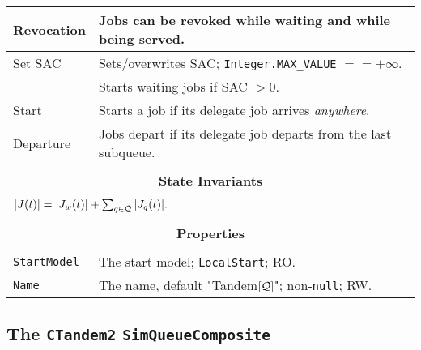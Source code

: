 \begin{tabular}{|l|l|}
Revocation & Jobs can be revoked while waiting and while being served. \\
\hline
Set SAC & Sets/overwrites SAC; \lstinline|Integer.MAX_VALUE| $== +\infty$. \\
        & Starts waiting jobs if SAC $> 0$. \\
\hline
Start & Starts a job if its delegate job arrives {\em anywhere}. \\
\hline
Departure & Jobs depart if its delegate job departs from the last subqueue. \\
\hline
\multicolumn{2}{|c|}{} \\
\multicolumn{2}{|c|}{\bf State  Invariants} \\
\multicolumn{2}{|c|}{} \\
\hline
\multicolumn{2}{|l|}{$|J(t)| = |J_{w}(t)| + \sum_{q \in \cal{Q}} |J_{q}(t)|.$} \\
\hline
\multicolumn{2}{|c|}{} \\
\multicolumn{2}{|c|}{\bf Properties} \\
\multicolumn{2}{|c|}{} \\
\hline
\lstinline|StartModel| & The start model; \lstinline|LocalStart|; RO. \\
\hline
\lstinline|Name|       & The name, default "Tandem$[\cal{Q}]$"; non-\lstinline|null|; RW. \\
\hline
\end{tabular}

\subsection{The \lstinline{CTandem2} \lstinline{SimQueueComposite}}
\label{sec:CTandem2}

